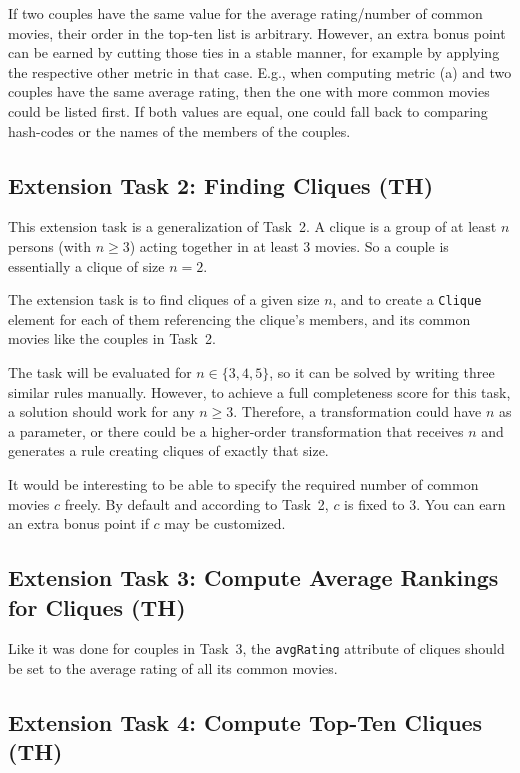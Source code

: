 \documentclass[a4paper,11pt]{article}
\begin{document}
If two couples have the same value for the average rating/number of common
movies, their order in the top-ten list is arbitrary.  However, an extra bonus
point can be earned by cutting those ties in a stable manner, for example by
applying the respective other metric in that case.  E.g., when computing metric
(a) and two couples have the same average rating, then the one with more common
movies could be listed first.  If both values are equal, one could fall back to
comparing hash-codes or the names of the members of the couples.

\subsection{Extension Task 2: Finding Cliques (TH)}

This extension task is a generalization of Task~2.  A clique is a group of at
least \(n\) persons (with \(n \geq 3\)) acting together in at least 3 movies.
So a couple is essentially a clique of size \(n = 2\).

The extension task is to find cliques of a given size \(n\), and to create a
\verb|Clique| element for each of them referencing the clique's members, and
its common movies like the couples in Task~2.

The task will be evaluated for \(n \in \{3, 4, 5\}\), so it can be solved by
writing three similar rules manually.  However, to achieve a full completeness
score for this task, a solution should work for any \(n \geq 3\).  Therefore, a
transformation could have \(n\) as a parameter, or there could be a
higher-order transformation that receives \(n\) and generates a rule creating
cliques of exactly that size.

It would be interesting to be able to specify the required number of common
movies \(c\) freely.  By default and according to Task~2, \(c\) is fixed to 3.
You can earn an extra bonus point if \(c\) may be customized.


\subsection{Extension Task 3: Compute Average Rankings for Cliques (TH)}

Like it was done for couples in Task~3, the \verb|avgRating| attribute of
cliques should be set to the average rating of all its common movies.

\subsection{Extension Task 4: Compute Top-Ten Cliques (TH)}
\end{document}
